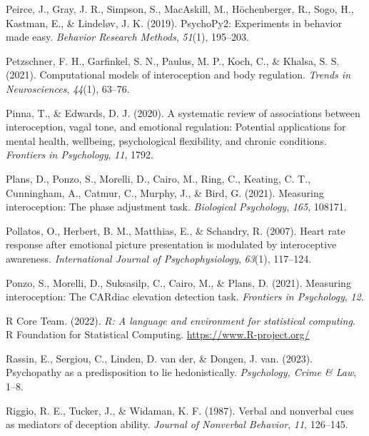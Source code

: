 \documentclass[
  man,mask,floatsintext]{apa6}
\newlength{\cslhangindent}
\newenvironment{CSLReferences}[2] %
 {\begin{list}{}{%
  \setlength{\itemindent}{0pt}
  \setlength{\leftmargin}{0pt}
  \setlength{\parsep}{0pt}
  \ifodd #1
   \setlength{\leftmargin}{\cslhangindent}
   \setlength{\itemindent}{-1\cslhangindent}
  \fi
  \setlength{\itemsep}{#2\baselineskip}}}
 {\end{list}}
\begin{document}
\begin{CSLReferences}{1}{0}
Peirce, J., Gray, J. R., Simpson, S., MacAskill, M., Höchenberger, R., Sogo, H., Kastman, E., \& Lindeløv, J. K. (2019). PsychoPy2: Experiments in behavior made easy. \emph{Behavior Research Methods}, \emph{51}(1), 195--203.

Petzschner, F. H., Garfinkel, S. N., Paulus, M. P., Koch, C., \& Khalsa, S. S. (2021). Computational models of interoception and body regulation. \emph{Trends in Neurosciences}, \emph{44}(1), 63--76.

Pinna, T., \& Edwards, D. J. (2020). A systematic review of associations between interoception, vagal tone, and emotional regulation: Potential applications for mental health, wellbeing, psychological flexibility, and chronic conditions. \emph{Frontiers in Psychology}, \emph{11}, 1792.

Plans, D., Ponzo, S., Morelli, D., Cairo, M., Ring, C., Keating, C. T., Cunningham, A., Catmur, C., Murphy, J., \& Bird, G. (2021). Measuring interoception: The phase adjustment task. \emph{Biological Psychology}, \emph{165}, 108171.

Pollatos, O., Herbert, B. M., Matthias, E., \& Schandry, R. (2007). Heart rate response after emotional picture presentation is modulated by interoceptive awareness. \emph{International Journal of Psychophysiology}, \emph{63}(1), 117--124.

Ponzo, S., Morelli, D., Suksasilp, C., Cairo, M., \& Plans, D. (2021). Measuring interoception: The CARdiac elevation detection task. \emph{Frontiers in Psychology}, \emph{12}.

R Core Team. (2022). \emph{R: A language and environment for statistical computing}. R Foundation for Statistical Computing. \url{https://www.R-project.org/}

Rassin, E., Sergiou, C., Linden, D. van der, \& Dongen, J. van. (2023). Psychopathy as a predisposition to lie hedonistically. \emph{Psychology, Crime \& Law}, 1--8.

Riggio, R. E., Tucker, J., \& Widaman, K. F. (1987). Verbal and nonverbal cues as mediators of deception ability. \emph{Journal of Nonverbal Behavior}, \emph{11}, 126--145.


\end{CSLReferences}
\end{document}
